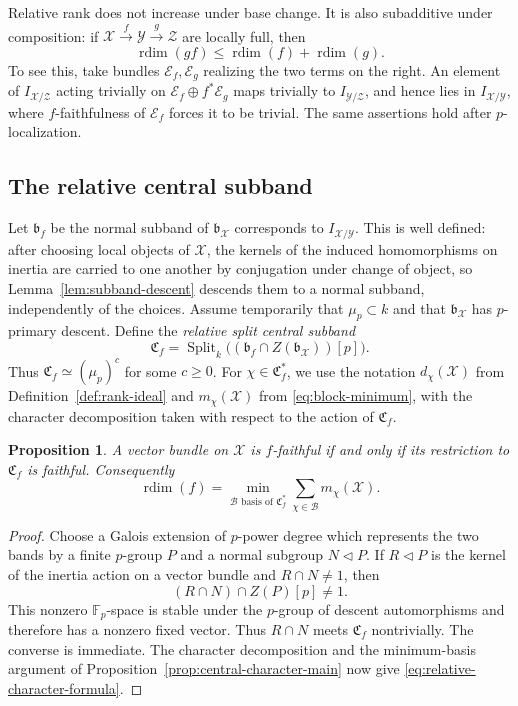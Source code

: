 \documentclass[11pt,reqno]{amsart}
\numberwithin{equation}{section}
\theoremstyle{plain}
\newtheorem{prop}{Proposition}[section]
\theoremstyle{definition}
\def\cX{{\mathcal X}}
\def\cE{{\mathcal E}}
\def\cY{{\mathcal Y}}
\def\cZ{{\mathcal Z}}
\def\fC{{\mathfrak C}}
\def\rdim{{\operatorname{rdim}}}
\def\Split{{\operatorname{Split}}}
\def\band{{\mathfrak b}}
\begin{document}
Relative rank does not increase under base change.  It is also
subadditive under composition: if
$\cX\xrightarrow{f}\cY\xrightarrow{g}\cZ$ are locally full, then
\[
\rdim(gf)\leq\rdim(f)+\rdim(g).
\]
To see this, take bundles $\cE_f,\cE_g$ realizing the two terms on the
right.  An element of $I_{\cX/\cZ}$ acting trivially on
$\cE_f\oplus f^*\cE_g$ maps trivially to $I_{\cY/\cZ}$, and hence
lies in $I_{\cX/\cY}$, where $f$-faithfulness of $\cE_f$ forces it to be trivial.  The same assertions
hold after $p$-localization.

\subsection{The relative central subband}

Let $\band_f$ be the normal subband of $\band_{\cX}$ corresponds to $I_{\cX/\cY}$. This is well defined: after choosing
local objects of $\cX$, the kernels of the induced homomorphisms on
inertia are carried to one another by conjugation under change of object,
so Lemma~\ref{lem:subband-descent} descends them to a normal subband,
independently of the choices.  Assume temporarily that $\mu_p\subset k$
and that $\band_{\cX}$ has $p$-primary descent.
Define the \emph{relative split central subband}
\begin{equation}\label{eq:relative-central-subband}
\fC_f=
\Split_k\bigl((\band_f\cap Z(\band_{\cX}))[p]\bigr).
\end{equation}
Thus $\fC_f\simeq(\mu_p)^c$ for some $c\geq0$.  For
$\chi\in\fC_f^*$, we use the notation $d_\chi(\cX)$ from
Definition~\ref{def:rank-ideal} and $m_\chi(\cX)$ from
\eqref{eq:block-minimum}, with the character decomposition taken with
respect to the action of $\fC_f$.

\begin{prop}
\label{prop:relative-faithfulness-criterion}
A vector bundle on $\cX$ is $f$-faithful if and only if its
restriction to $\fC_f$ is faithful.  Consequently
\begin{equation}\label{eq:relative-character-formula}
\rdim(f)=
\min_{\mathcal B\text{ basis of }\fC_f^*}
\sum_{\chi\in\mathcal B}m_\chi(\cX).
\end{equation}
\end{prop}

\begin{proof}
Choose a Galois extension of $p$-power degree which represents the two
bands by a finite $p$-group $P$ and a normal subgroup
$N\triangleleft P$.  If $R\triangleleft P$ is the kernel of
the inertia action on a vector bundle and $R\cap N\ne1$, then
\[
(R\cap N)\cap Z(P)[p]\ne1.
\]
This nonzero $\mathbb F_p$-space is stable under the $p$-group of
descent automorphisms and therefore has a nonzero fixed vector.  Thus
$R\cap N$ meets $\fC_f$ nontrivially.  The converse is immediate.
The character decomposition and the minimum-basis argument of
Proposition~\ref{prop:central-character-main} now give
\eqref{eq:relative-character-formula}.
\end{proof}
\end{document}
